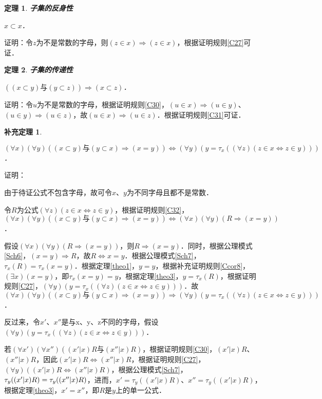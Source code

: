 \documentclass[12pt, a4paper, oneside]{book}
\newtheorem{theo}{定理}
\newtheorem{cor}{补充定理}
\begin{document}
			\begin{theo}\label{theo4}
				\textbf{子集的反身性}
				\par
				$x\subset x$．
			\end{theo}
			证明：令$z$为不是常数的字母，则$(z\in x)\Rightarrow (z\in x)$，根据证明规则\ref{C27}可证．

			\begin{theo}\label{theo5}
				\textbf{子集的传递性}
				\par
				$((x\subset y)\text{与}(y\subset z))\Rightarrow (x\subset z)$．
			\end{theo}
			证明：令$u$为不是常数的字母，根据证明规则\ref{C30}，$(u\in x)\Rightarrow(u\in y)$、$(u\in y)\Rightarrow(u\in z)$，故$(u\in x)\Rightarrow(u\in z)$．根据证明规则\ref{C31}可证．

			\begin{cor}\label{cor1}
				\hfill\par
				$(\forall x)(\forall y)((x\subset y)\text{与}(y\subset x)\Rightarrow (x=y))\Leftrightarrow (\forall y)(y=\tau_x((\forall z)(z\in x\Leftrightarrow z\in y)))$．
			\end{cor}
			证明：
			\par
			由于待证公式不包含字母，故可令$x$、$y$为不同字母且都不是常数．
			\par
			令$R$为公式$(\forall z)(z\in x\Leftrightarrow z\in y)$，根据证明规则\ref{C32}，$(\forall x)(\forall y)((x\subset y)\text{与}(y\subset x)\Rightarrow (x=y))\Leftrightarrow (\forall x)(\forall y)(R\Rightarrow (x=y))$．
			\par
			假设$(\forall x)(\forall y)(R\Rightarrow (x=y))$，则$R\Rightarrow (x=y)$．同时，根据公理模式\ref{Sch6}，$(x=y)\Rightarrow R$，故$R\Leftrightarrow x=y$．根据公理模式\ref{Sch7}，$\tau_x(R)=\tau_x(x=y)$．根据定理\ref{theo1}，$y=y$，根据补充证明规则\ref{Ccor8}，$(\exists x)(x=y)$，即$\tau_x(x=y)=y$，根据定理\ref{theo3}，$y=\tau_x(R)$，根据证明规则\ref{C27}，$(\forall y)(y=\tau_x((\forall z)(z\in x\Leftrightarrow z\in y)))$．故$(\forall x)(\forall y)((x\subset y)\text{与}(y\subset x)\Rightarrow (x=y))\Rightarrow (\forall y)(y=\tau_x((\forall z)(z\in x\Leftrightarrow z\in y)))$．
			\par
			反过来，令$x'$、$x''$是与x、y、z不同的字母，假设$(\forall y)(y=\tau_x((\forall z)(z\in x\Leftrightarrow z\in y)))$．
			\par
			若$(\forall x')(\forall x'')((x'|x)R\text{与}(x''|x)R)$，根据证明规则\ref{C30}，$(x'|x)R$、$(x''|x)R$，因此$(x'|x)R\Leftrightarrow (x''|x)R$，根据证明规则\ref{C27}，$(\forall y)((x'|x)R\Leftrightarrow (x''|x)R)$，根据公理模式\ref{Sch7}，$\tau_y((x'|x)R)=\\\tau_y((x''|x)R)$，进而，$x'=\tau_y((x'|x)R)$、$x''=\tau_y((x'|x)R)$，根据定理\ref{theo3}，$x'=x''$，即$R$是$y$上的单一公式．
\end{document}
